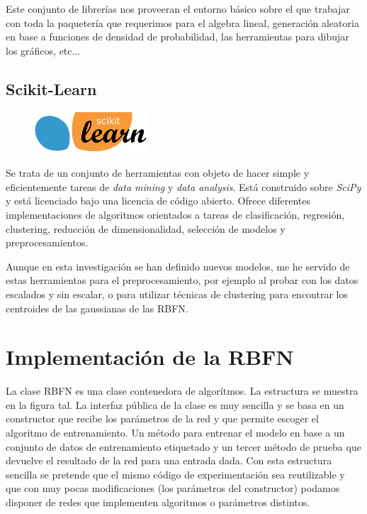\documentclass[10pt,a4paper]{report}
\begin{document}
Este conjunto de librerías nos proveeran el entorno básico sobre el que trabajar con toda la paquetería que requerimos para el algebra lineal, generación aleatoria en base a funciones de densidad de probabilidad, las herramientas para dibujar los gráficos, etc...

\subsection{Scikit-Learn\cite{scikitlearn2014}}
\begin{figure}[!h]{}
    \centering
    \includegraphics[scale=0.6]{img/scikit-learn-logo-small.png}
\end{figure}
Se trata de un conjunto de herramientas con objeto de hacer simple y eficientemente tareas de \textit{data mining} y \textit{data analysis}. Está construido sobre \textit{SciPy} y está licenciado bajo una licencia de código abierto. Ofrece diferentes implementaciones de algoritmos orientados a tareas de clasificación, regresión, clustering, reducción de dimensionalidad, selección de modelos y preprocesamientos.

Aunque en esta investigación se han definido nuevos modelos, me he servido de estas herramientas para el preprocesamiento, por ejemplo al probar con los datos escalados y sin escalar, o para utilizar técnicas de clustering para encontrar los centroides de las gaussianas de las RBFN.

\section{Implementación de la RBFN}
La clase RBFN es una clase contenedora de algorítmos. La estructura se muestra en la figura tal. La interfaz pública de la clase es muy sencilla y se basa en un constructor que recibe los parámetros de la red y que permite escoger el algoritmo de entrenamiento. Un método para entrenar el modelo en base a un conjunto de datos de entrenamiento etiquetado y un tercer método de prueba que devuelve el resultado de la red para una entrada dada.
Con esta estructura sencilla se pretende que el mismo código de experimentación sea reutilizable y que con muy pocas modificaciones (los parámetros del constructor) podamos disponer de redes que implementen algoritmos o parámetros distintos.
\end{document}
